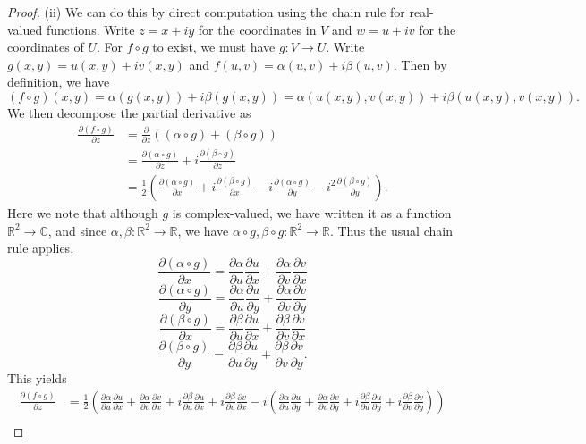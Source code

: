 \documentclass[11pt, letterpaper]{article}
\theoremstyle{plain}
\begin{document}
\begin{proof}
	(ii) We can do this by direct computation using the chain rule for real-valued functions. Write $z=x+iy$ for the coordinates in $V$ and $w=u+iv$ for the coordinates of $U$. For $f\circ g$ to exist, we must have $g : V \to U$. Write $g(x,y)=u(x,y)+iv(x,y)$ and $f(u,v)=\alpha (u,v)+i\beta (u,v)$. Then by definition, we have
	\[
		(f\circ g)(x,y)=\alpha (g(x,y))+i\beta (g(x,y))=\alpha (u(x,y),v(x,y))+i\beta (u(x,y),v(x,y))
	.\]
	We then decompose the partial derivative as
	\begin{align*}
		\frac{\partial (f\circ g)}{\partial z} &= \frac{\partial }{\partial z} ((\alpha \circ g) + (\beta  \circ g))\\
						       &=\frac{\partial (\alpha \circ g)}{\partial z} +i\frac{\partial (\beta \circ g)}{\partial z} \\
						       &=\frac{1}{2} \left( \frac{\partial (\alpha \circ g)}{\partial x} + i\frac{\partial (\beta \circ g)}{\partial x} -i \frac{\partial (\alpha \circ g)}{\partial y} -i^2\frac{\partial (\beta \circ g)}{\partial y}  \right) 
	.\end{align*}
	Here we note that although $g$ is complex-valued, we have written it as a function $\mathbb{R} ^2\to \mathbb{C} $, and since $\alpha ,\beta  : \mathbb{R} ^2 \to \mathbb{R} $, we have $\alpha \circ g,\beta \circ g : \mathbb{R} ^2 \to \mathbb{R} $. Thus the usual chain rule applies.
	\[
		\frac{\partial (\alpha \circ g)}{\partial x} =\frac{\partial \alpha }{\partial u} \frac{\partial u}{\partial x} +\frac{\partial \alpha }{\partial v} \frac{\partial v}{\partial x} 
	\]
	\[
		\frac{\partial (\alpha \circ g)}{\partial y} =\frac{\partial \alpha }{\partial u} \frac{\partial u}{\partial y} +\frac{\partial \alpha }{\partial v} \frac{\partial v}{\partial y} 
	\]
	\[
		\frac{\partial (\beta \circ g)}{\partial x} =\frac{\partial \beta }{\partial u} \frac{\partial u}{\partial x} +\frac{\partial \beta }{\partial v} \frac{\partial v}{\partial x} 
	\]
	\[
		\frac{\partial (\beta \circ g)}{\partial y} =\frac{\partial \beta }{\partial u} \frac{\partial u}{\partial y} +\frac{\partial \beta }{\partial v} \frac{\partial v}{\partial y} 
	.\]
	This yields
	\begin{align*}
		\frac{\partial (f\circ g)}{\partial z} &=\frac{1}{2} \left( \frac{\partial \alpha }{\partial u} \frac{\partial u}{\partial x} +\frac{\partial \alpha }{\partial v} \frac{\partial v}{\partial x} +i\frac{\partial \beta }{\partial u} \frac{\partial u}{\partial x} +i\frac{\partial \beta }{\partial v} \frac{\partial v}{\partial x} -i \left( \frac{\partial \alpha }{\partial u} \frac{\partial u}{\partial y} +\frac{\partial \alpha }{\partial v} \frac{\partial v}{\partial y} +i\frac{\partial \beta }{\partial u} \frac{\partial u}{\partial y} +i\frac{\partial \beta }{\partial v} \frac{\partial v}{\partial y}  \right)  \right) \\

\end{align*}
\end{proof}
\end{document}
